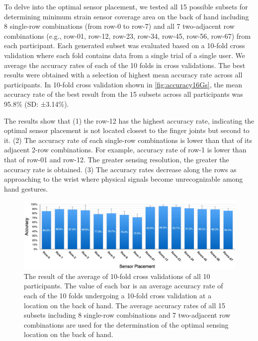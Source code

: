 \documentclass{sigchi}
\begin{document}

To delve into the optimal sensor placement, we tested all 15 possible subsets for determining minimum strain sensor coverage area on the back of hand including 8 single-row combinations (from row-0 to row-7) and all 7 two-adjacent row combinations (e.g., row-01, row-12, row-23, row-34, row-45, row-56, row-67) from each participant.
Each generated subset was evaluated based on a 10-fold cross validation where each fold contains data from a single trial of a single user. We average the accuracy rates of each of the 10 folds in cross validations.
The best results were obtained with a selection of highest mean accuracy rate across all participants.
In 10-fold cross validation shown in \autoref{fig:accuracy16Gs}, the mean accuracy rate of the best result from the 15 subsets across all participants was 95.8\% (SD: ±3.14\%).

The results show that
(1) the row-12 has the highest accuracy rate, indicating the optimal sensor placement is not located closest to the finger joints but second to it. 
(2) The accuracy rate of each single-row combinations is lower than that of its adjacent 2-row combinations. For example, accuracy rate of row-1 is lower than that of row-01 and row-12. The greater sensing resolution, the greater the accuracy rate is obtained. 
(3) The accuracy rates decrease along the rows as approaching to the wrist where physical signals become unrecognizable among hand gestures.

\begin{figure}
 \begin{center}
  \includegraphics[width=2\columnwidth]{figures/10FCV_16.pdf}
  \caption{
    The result of the average of 10-fold cross validations of all 10 participants. The value of each bar is an average accuracy rate of each of the 10 folds undergoing a 10-fold cross validation at a location on the back of hand. The average accuracy rates of all 15 subsets including 8 single-row combinations and 7 two-adjacent row combinations are used for the determination of the optimal sensing location on the back of hand.
  }
  \label{fig:accuracy16Gs}
  \end{center}
\end{figure}
\end{document}
